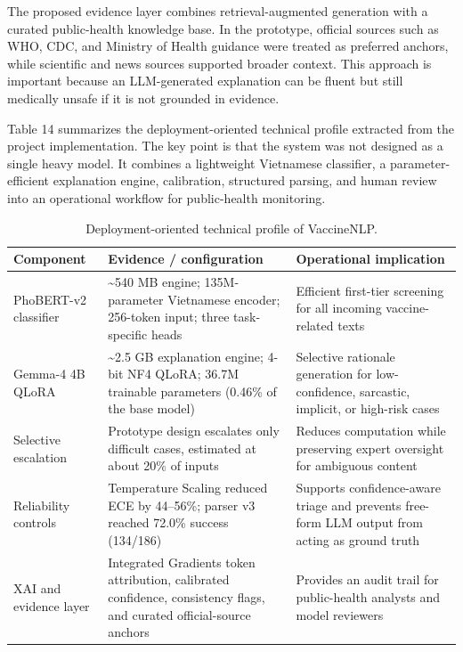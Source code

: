 \documentclass[runningheads]{llncs}
\begin{document}
The proposed evidence layer combines retrieval-augmented generation with a curated public-health knowledge base. In the prototype, official sources such as WHO, CDC, and Ministry of Health guidance were treated as preferred anchors, while scientific and news sources supported broader context. This approach is important because an LLM-generated explanation can be fluent but still medically unsafe if it is not grounded in evidence.

Table 14 summarizes the deployment-oriented technical profile extracted from the project implementation. The key point is that the system was not designed as a single heavy model. It combines a lightweight Vietnamese classifier, a parameter-efficient explanation engine, calibration, structured parsing, and human review into an operational workflow for public-health monitoring.

\begin{table}[t]
\caption{Deployment-oriented technical profile of VaccineNLP.}\label{tab:deploymentprofile}
\centering
\scriptsize
\setlength{\tabcolsep}{2.0pt}
\renewcommand{\arraystretch}{1.08}
\begin{tabular}{@{}>{\raggedright\arraybackslash}p{}>{\raggedright\arraybackslash}p{}>{\raggedright\arraybackslash}p{}@{}}
\hline
Component & Evidence / configuration & Operational implication\\
\hline
PhoBERT-v2 classifier & \textasciitilde{}540 MB engine; 135M-parameter Vietnamese encoder; 256-token input; three task-specific heads & Efficient first-tier screening for all incoming vaccine-related texts\\
Gemma-4 4B QLoRA & \textasciitilde{}2.5 GB explanation engine; 4-bit NF4 QLoRA; 36.7M trainable parameters (0.46\% of the base model) & Selective rationale generation for low-confidence, sarcastic, implicit, or high-risk cases\\
Selective escalation & Prototype design escalates only difficult cases, estimated at about 20\% of inputs & Reduces computation while preserving expert oversight for ambiguous content\\
Reliability controls & Temperature Scaling reduced ECE by 44--56\%; parser v3 reached 72.0\% success (134/186) & Supports confidence-aware triage and prevents free-form LLM output from acting as ground truth\\
XAI and evidence layer & Integrated Gradients token attribution, calibrated confidence, consistency flags, and curated official-source anchors & Provides an audit trail for public-health analysts and model reviewers\\
\hline
\end{tabular}
\end{table}
\end{document}
